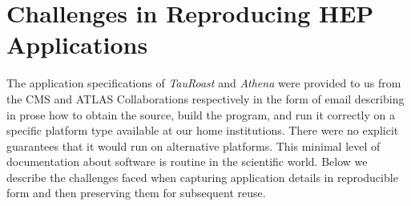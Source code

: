 \section{Challenges in Reproducing HEP Applications}

The application specifications of \emph{TauRoast} and \emph{Athena} were provided to us from the CMS and ATLAS Collaborations respectively in the form of 
email describing in prose how to obtain the source, build the program, and run it correctly on a specific platform type available at our home institutions.  There were no explicit guarantees that it would run on alternative platforms.  This minimal level of documentation about software is routine in the scientific world. 
Below we describe the challenges faced when capturing application details in reproducible form and then preserving them for subsequent reuse.

